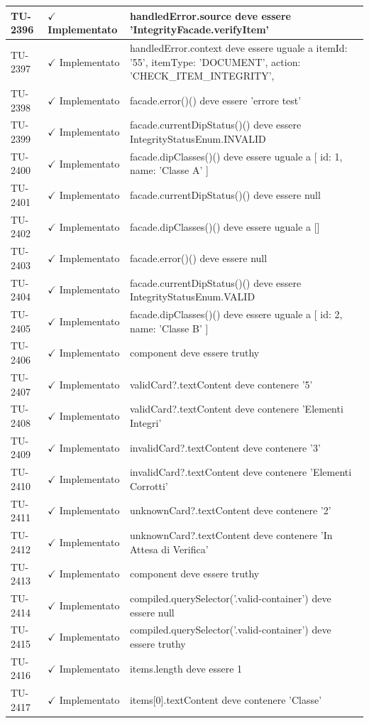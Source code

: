 ﻿\documentclass[a4paper,12pt]{article}
\newcommand{\ok}{\textcolor{green!60!black}{$\checkmark$ Implementato}}
\begin{document}
\begin{longtable}{|p{2cm}|p{3.5cm}|p{9.5cm}|}
\hline
TU-2396 & \ok & handledError.source deve essere 'IntegrityFacade.verifyItem' \\
\hline
TU-2397 & \ok & handledError.context deve essere uguale a { itemId: '55', itemType: 'DOCUMENT', action: 'CHECK\_ITEM\_INTEGRITY', } \\
\hline
TU-2398 & \ok & facade.error()() deve essere 'errore test' \\
\hline
TU-2399 & \ok & facade.currentDipStatus()() deve essere IntegrityStatusEnum.INVALID \\
\hline
TU-2400 & \ok & facade.dipClasses()() deve essere uguale a [{ id: 1, name: 'Classe A' }] \\
\hline
TU-2401 & \ok & facade.currentDipStatus()() deve essere null \\
\hline
TU-2402 & \ok & facade.dipClasses()() deve essere uguale a [] \\
\hline
TU-2403 & \ok & facade.error()() deve essere null \\
\hline
TU-2404 & \ok & facade.currentDipStatus()() deve essere IntegrityStatusEnum.VALID \\
\hline
TU-2405 & \ok & facade.dipClasses()() deve essere uguale a [{ id: 2, name: 'Classe B' }] \\
\hline
TU-2406 & \ok & component deve essere truthy \\
\hline
TU-2407 & \ok & validCard?.textContent deve contenere '5' \\
\hline
TU-2408 & \ok & validCard?.textContent deve contenere 'Elementi Integri' \\
\hline
TU-2409 & \ok & invalidCard?.textContent deve contenere '3' \\
\hline
TU-2410 & \ok & invalidCard?.textContent deve contenere 'Elementi Corrotti' \\
\hline
TU-2411 & \ok & unknownCard?.textContent deve contenere '2' \\
\hline
TU-2412 & \ok & unknownCard?.textContent deve contenere 'In Attesa di Verifica' \\
\hline
TU-2413 & \ok & component deve essere truthy \\
\hline
TU-2414 & \ok & compiled.querySelector('.valid-container') deve essere null \\
\hline
TU-2415 & \ok & compiled.querySelector('.valid-container') deve essere truthy \\
\hline
TU-2416 & \ok & items.length deve essere 1 \\
\hline
TU-2417 & \ok & items[0].textContent deve contenere 'Classe' \\

\end{longtable}
\end{document}
